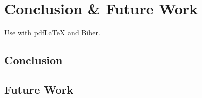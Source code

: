 
\chapter{Conclusion \& Future Work}\label{chapter:conclusion}
Use with pdfLaTeX and Biber.

\section{Conclusion}


\section{Future Work}
